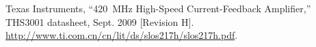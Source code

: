 \begin{thebibliography}{9}
Texas Instruments, ``420~MHz High-Speed Current-Feedback Amplifier,''
THS3001 datasheet, Sept. 2009 [Revision H]. \url{http://www.ti.com.cn/cn/lit/ds/slos217h/slos217h.pdf}.

%
\end{thebibliography}
